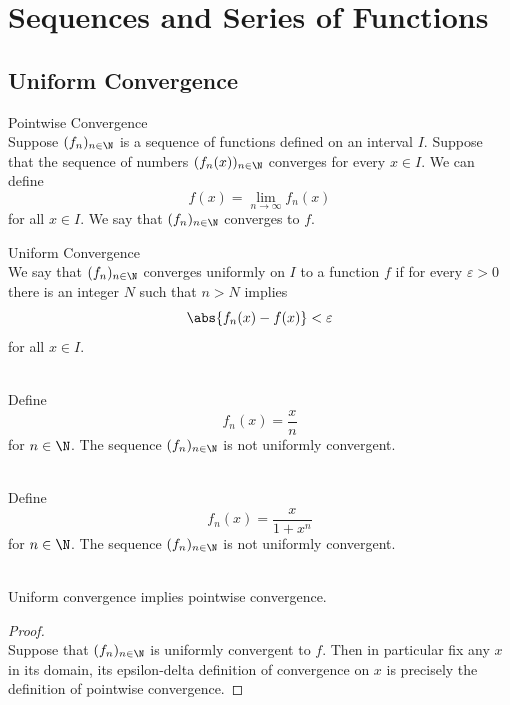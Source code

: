\documentclass[a4paper]{article}
\begin{document}
\pagebreak
\section{Sequences and Series of Functions}
\subsection{Uniform Convergence}
\begin{defn}{Pointwise Convergence}{}\\ Suppose $(f_n)_{n\in\N}$ is a sequence of functions defined on an interval $I$. Suppose that the sequence of numbers $(f_n(x))_{n\in\N}$ converges for every $x\in I$. We can define $$f(x)=\lim_{n\to\infty}f_n(x)$$ for all $x\in I$. We say that $(f_n)_{n\in\N}$ converges to $f$. 
\end{defn}

\begin{defn}{Uniform Convergence}{}\\ We say that $(f_n)_{n\in\N}$ converges uniformly on $I$ to a function $f$ if for every $\varepsilon>0$ there is an integer $N$ such that $n>N$ implies $$\abs{f_n(x)-f(x)}<\varepsilon$$ for all $x\in I$. 
\end{defn}
\begin{eg}{}{}\\ Define $$f_n(x)=\frac{x}{n}$$ for $n\in\N$. The sequence $(f_n)_{n\in\N}$ is not uniformly convergent. 
\end{eg}

\begin{eg}{}{}\\ Define $$f_n(x)=\frac{x}{1+x^n}$$ for $n\in\N$. The sequence $(f_n)_{n\in\N}$ is not uniformly convergent. 
\end{eg}

\begin{crl}{}{}\\ Uniform convergence implies pointwise convergence. 
\begin{proof}\\ Suppose that $(f_n)_{n\in\N}$ is uniformly convergent to $f$. Then in particular fix any $x$ in its domain, its epsilon-delta definition of convergence on $x$ is precisely the definition of pointwise convergence. 
\end{proof}
\end{crl}
\end{document}
